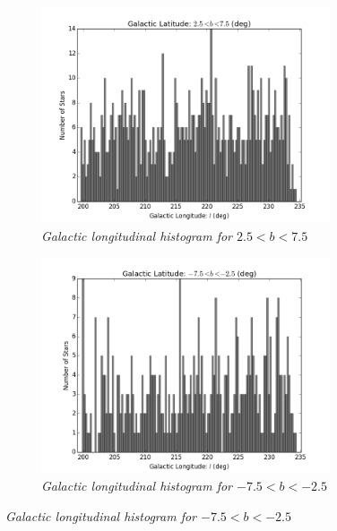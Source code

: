 \documentclass[aps,prb,twocolumn,superscriptaddress]{revtex4-1}
\begin{document}
\begin{figure}
	\centering
	\begin{subfigure}{.5\textwidth}
	  \centering
	  \includegraphics[width=3.35in]{figures/PlotsSpace15/lphist_limit15.png}
		\caption{\it \small{Galactic longitudinal histogram for $2.5 < b < 7.5$}}
		\label{fig:lphist}
	\end{subfigure}%
	\begin{subfigure}{.5\textwidth}
	  \centering
			\includegraphics[width=3.35in]{figures/PlotsSpace15/lnhist_limit15.png}
		\caption{\it \small{Galactic longitudinal histogram for $-7.5 < b < -2.5$ }}
		\label{fig:lnhist}
	\end{subfigure}%
	

\end{figure}
\end{document}
